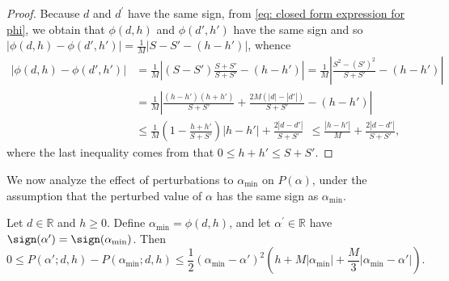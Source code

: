 \begin{proof}
    Because $d$ and $d^{\prime}$ have the same sign, from \eqref{eq: closed form expression for phi}, we obtain that $\phi(d,h)$ and $\phi(d', h')$ have the same sign and so $|\phi(d,h) -\phi(d', h')| = \frac{1}{M}|S - S' - (h - h')|$, whence
    \begin{align*}
        |\phi(d,h) -\phi(d', h')| & = \frac{1}{M}\left|\left(S - S'\right)\frac{S + S'}{S + S'} - (h - h')\right| = \frac{1}{M}\left|\frac{S^2 - (S')^2}{S + S'} - (h - h')\right| \\
                                  & = \frac{1}{M} \left|
        \frac{(h-h')(h+h')}{S+S'} + \frac{2M(|d|-|d'|)}{S+S'} - (h-h')
        \right|                                                                                                                                                                    \\
                                  & \leq  \frac{1}{M} \left(1 - \frac{h+h'}{S+S'}\right)|h-h'| + \frac{2|d-d'|}{S+S'}
        ~~ \leq \frac{|h-h'|}{M} + \frac{2|d-d'|}{S+S'},
    \end{align*}
    where the last inequality comes from that $0 \leq h + h' \leq S + S'$.
\end{proof}
We now analyze the effect of perturbations to $\alpha_{\mathrm{min}}$ on $P(\alpha)$, under the assumption that the perturbed value of $\alpha$ has the same sign as $\alpha_{\mathrm{min}}$.
\begin{lemma}
    \label{lemma: perturbation of P near min}
    Let $d \in \mathbb{R}$ and $h \geq 0$. Define $\alpha_{\mathrm{min}} = \phi(d, h)$, and let $\alpha^{\prime} \in \mathbb{R}$ have $\sign(\alpha') = \sign(\alpha_{\mathrm{min}})$. Then
    \begin{equation}\label{eq: Perturbation of P near min}
        0 \leq P(\alpha';d,h) - P(\alpha_{\mathrm{min}};d,h)
        \leq \frac{1}{2}(\alpha_{\mathrm{min}} - \alpha')^2 ( h + M|\alpha_{\mathrm{min}}| + \frac{M}{3}|\alpha_{\mathrm{min}} - \alpha'|).
    \end{equation}
\end{lemma}
